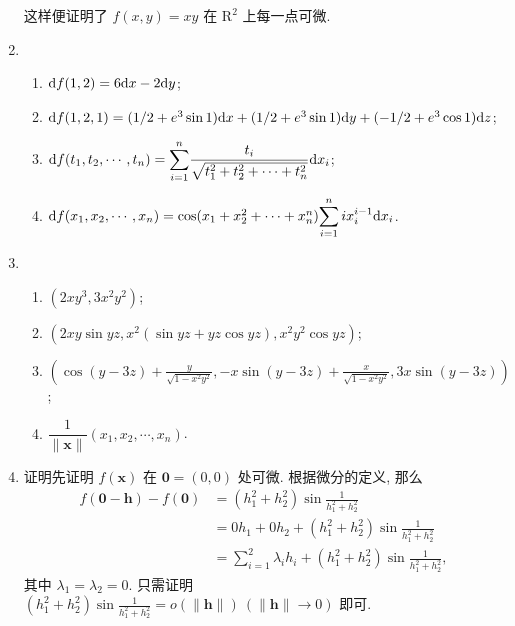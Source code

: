 \begin{enumerate}
\[        \]
        这样便证明了 $f(x, y) = xy$ 在 $\mathrm{R}^2$ 上每一点可微.
    \item %
        \begin{enumerate}[(1)]
            \item %
                $\mathrm{d}{f(1, 2)} = 6\mathrm{d}{x} - 2\mathrm{d}{y}$;
            \item %
                $\mathrm{d}{f(1, 2, 1)} = (1/2 + e^3\sin1)\mathrm{d} x + (1/2 + e^3\sin1)\mathrm{d} y + (-1/2 + e^3\cos1)\mathrm{d} z$;
            \item %
                $\mathrm{d} f(t_1, t_2, \cdots, t_n) = \displaystyle{\sum_{i=1}^n}\frac{t_i}{\sqrt{t_1^2 + t_2^2 + \cdots + t_n^2}}\mathrm{d} x_i$;
            \item %
                $\mathrm{d} f(x_1, x_2, \cdots, x_n) = \cos(x_1 + x_2^2 + \cdots + x_n^n)\displaystyle{\sum_{i=1}^nix_i^{i-1}\mathrm{d}x_i}$.
        \end{enumerate}
    \item %
        \begin{enumerate}[(1)]
            \item %
                $(2xy^3, 3x^2y^2)$;
            \item %
                $(2xy\sin{yz}, x^2(\sin{yz}+yz\cos{yz}), x^2y^2\cos{yz})$;
            \item %
                $\displaystyle{
                    \left(
                        \cos(y-3z) + \frac{y}{\sqrt{1-x^2y^2}}, -x\sin(y-3z) + \frac{x}{\sqrt{1-x^2y^2}}, 3x\sin(y-3z)    
                    \right)
                }$;
            \item %
                $\dfrac{1}{\|\boldsymbol{x}\|}(x_1, x_2, \cdots, x_n)$.
        \end{enumerate}
    \item %
        {\heiti 证明}\quad 先证明 $f(\boldsymbol{x})$ 在 $\boldsymbol{0} = (0,0)$ 处可微. 根据微分的定义, 那么
        \begin{align*}
            f(\boldsymbol{0} - \boldsymbol{h}) - f(\boldsymbol{0}) &= (h_1^2 + h_2^2)\sin\frac{1}{h_1^2 + h_2^2} \\
            &= 0h_1 + 0h_2 + (h_1^2 + h_2^2)\sin\frac{1}{h_1^2 + h_2^2} \\
            &= \sum_{i=1}^2\lambda_ih_i + (h_1^2 + h_2^2)\sin\frac{1}{h_1^2 + h_2^2},   
        \end{align*}
        其中 $\lambda_1 = \lambda_2 = 0$. 只需证明 $(h_1^2 + h_2^2)\sin\frac{1}{h_1^2 + h_2^2} = o(\|\boldsymbol{h}\|)\ (\|\boldsymbol{h}\|\to0)$ 即可.

\end{enumerate}
